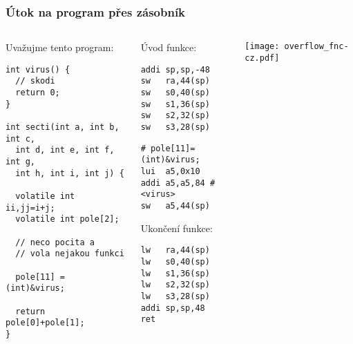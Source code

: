 \documentclass{beamer}
\begin{document}
\begin{frame}[fragile,shrink=5]
\frametitle{Útok na program přes zásobník}

\begin{columns}
\begin{column}{0.42\textwidth}
Uvažujme tento program:

\begin{verbatim}
int virus() {
  // skodi
  return 0;
}

int secti(int a, int b, int c, 
  int d, int e, int f, int g, 
  int h, int i, int j) {
  
  volatile int ii,jj=i+j;
  volatile int pole[2];
  
  // neco pocita a
  // vola nejakou funkci
  
  pole[11] = (int)&virus;
  
  return pole[0]+pole[1];
}
\end{verbatim}
\end{column}   
\begin{column}{0.25\textwidth}
Úvod funkce:

\begin{verbatim}
addi sp,sp,-48
sw   ra,44(sp)
sw   s0,40(sp)
sw   s1,36(sp)
sw   s2,32(sp)
sw   s3,28(sp)
\end{verbatim}


\begin{verbatim}
# pole[11]=(int)&virus;
lui  a5,0x10
addi a5,a5,84 # <virus>
sw   a5,44(sp)
\end{verbatim}

Ukončení funkce:

\begin{verbatim}
lw   ra,44(sp)
lw   s0,40(sp)
lw   s1,36(sp)
lw   s2,32(sp)
lw   s3,28(sp)
addi sp,sp,48
ret
\end{verbatim}
\end{column}
\begin{column}{0.33\textwidth}  
\texttt{[image: overflow\_fnc-cz.pdf]}
\end{column}
\end{columns}
\end{frame}
\end{document}
